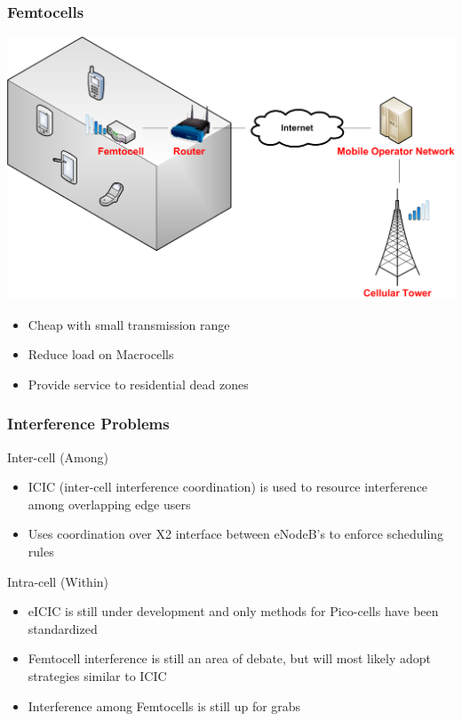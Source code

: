 \documentclass{beamer}
\begin{document}

\begin{frame}
\frametitle{Femtocells}
\centering
\includegraphics[width=0.8\linewidth]{images/femto.png}
\begin{itemize}
  \item Cheap with small transmission range
  \item Reduce load on Macrocells
  \item Provide service to residential dead zones
\end{itemize}
\end{frame}

\begin{frame}
\frametitle{Interference Problems}

\begin{block}{Inter-cell (Among)}
\begin{itemize}
  \item ICIC (inter-cell interference coordination) is used to resource interference among overlapping edge users
  \item Uses coordination over X2 interface between eNodeB's to enforce scheduling rules
\end{itemize}
\end{block}

\begin{block}{Intra-cell (Within)}
\begin{itemize}
  \item eICIC is still under development and only methods for Pico-cells have been standardized
  \item Femtocell interference is still an area of debate, but will most likely adopt strategies similar to ICIC
  \item Interference among Femtocells is still up for grabs
\end{itemize}
\end{block}

\end{frame}
\end{document}
